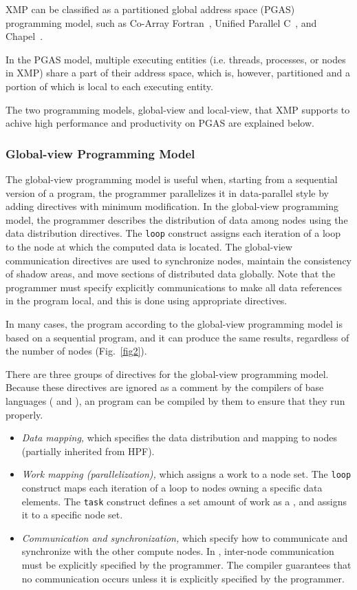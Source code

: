 XMP can be classified as a
partitioned global address space (PGAS) programming model, such as
Co-Array Fortran~\cite{caf}, Unified Parallel C~\cite{upc}, and
Chapel~\cite{chapel}.

In the PGAS model, multiple executing entities (i.e. threads, processes,
or nodes in XMP) share a part of their address space, which is, however,
partitioned and a portion of which is local to each executing entity.

The two programming models, global-view and local-view, that XMP
supports to achive high performance and productivity on PGAS are
explained below.

\subsubsection{Global-view Programming Model}

The global-view programming model is useful when, starting from a
sequential version of a program, the programmer parallelizes it in
data-parallel style by adding directives with minimum modification.
%
In the global-view programming model, the programmer describes the
distribution of data among nodes using the data distribution
directives.
%
The {\tt loop} construct assigns each iteration of a loop to the node
at which the computed data is located. 
%
The global-view communication directives are used to synchronize nodes,
maintain the consistency of shadow areas, and move sections of 
distributed data globally.
%
Note that the programmer must specify explicitly communications to make
all data references in the program local, and this is done using
appropriate directives.

In many cases, the {\XMP} program according to the global-view
programming model is based on a sequential program, and it can produce
the same results, regardless of the number of nodes (Fig.~\ref{fig2}).

There are three groups of directives for the global-view programming
model. Because these directives are ignored as a comment by the
compilers of base languages ({\Fort} and {\C}), an {\XMP} program can be
compiled by them to ensure that they run properly.

\begin{itemize}
  \item {\it Data mapping,} which specifies the data distribution and mapping
		to nodes (partially inherited from HPF).
  \item {\it Work mapping (parallelization),} which assigns a work to a node
		set. The {\tt loop} construct maps each iteration of a loop to
		nodes owning a specific data elements. The {\tt task} construct
		defines a set amount of work as a {\it {}}, and assigns
		it to a specific node set.
  \item {\it Communication and synchronization,} which specify how to
		communicate and synchronize with the other compute nodes. In
		{\XMP}, inter-node communication must be explicitly specified by
		the programmer. The compiler guarantees that no communication
		occurs unless it is explicitly specified by the programmer.
\end{itemize}

